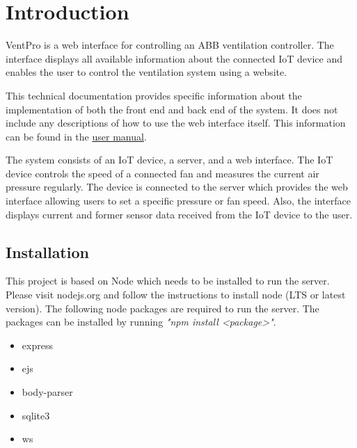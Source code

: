 
\chapter{Introduction}
\label{ch:introduction}

VentPro is a web interface for controlling an ABB ventilation controller. The interface displays all available information about the connected IoT device and enables the user to control the ventilation system using a website. 

This technical documentation provides specific information about the implementation of both the front end and back end of the system. It does not include any descriptions of how to use the web interface itself. This information can be found in the  \href{https://github.com/sischae/Internet_of_Things_Project/blob/main/doc/user_manual/user_manual.pdf}{user manual}.

The system consists of an IoT device, a server, and a web interface. The IoT device controls the speed of a connected fan and measures the current air pressure regularly. The device is connected to the server which provides the web interface allowing users to set a specific pressure or fan speed. Also, the interface displays current and former sensor data received from the IoT device to the user.





\section{Installation}
\label{sec:installation}

This project is based on Node which needs to be installed to run the server. Please visit nodejs.org and follow the instructions to install node (LTS or latest version). The following node packages are required to run the server. The packages can be installed by running \textit{"npm install <package>"}.

\begin{itemize}
	\item express
    \item ejs
    \item body-parser
    \item sqlite3
    \item ws
\end{itemize}

